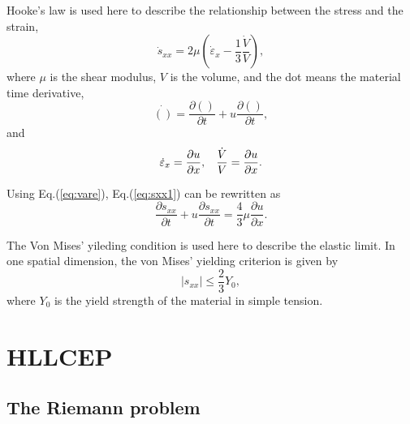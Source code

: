 \documentclass{article}
\numberwithin{equation}{section}
\numberwithin{table}{section}
\begin{document}
Hooke's law is used here to describe the relationship between the stress and the strain, 
\begin{equation}\label{eq:sxx1}
\dot{s}_{xx} = 2\mu \left(\dot{\varepsilon}_x-\frac{1}{3}\frac{\dot{V}}{V}\right),
\end{equation}
where $\mu$ is the shear modulus, $V$ is the volume, and the dot means the material time derivative,
\begin{equation}
  \dot{()} = \frac{\partial ()}{\partial t} + u \frac{\partial ()}{\partial t},
\end{equation}
and
\begin{equation}\label{eq:vare}
  \dot{\varepsilon}_x = \frac{\partial u}{\partial x}, \hspace{0.3cm} \frac{\dot{V}}{V} = \frac{\partial u}{\partial x}.
\end{equation}

Using Eq.(\ref{eq:vare}), Eq.(\ref{eq:sxx1}) can be rewritten as 
\begin{equation}\label{eq:sxx}
  \frac{\partial s_{xx}}{\partial t} + u \frac{\partial s_{xx}}{\partial t} =\frac{4}{3}\mu \frac{\partial u}{\partial x}.
\end{equation}

The Von Mises' yileding condition is used here to describe the elastic limit. In one spatial dimension, the von Mises' yielding criterion is given by
\begin{equation}
  |s_{xx}| \le \frac{2}{3}Y_0,
\end{equation}
where $Y_0$ is the yield strength of the material in simple tension.


\section{HLLCEP}\label{sec:HLLCEP}
\subsection{The Riemann problem}
\end{document}
